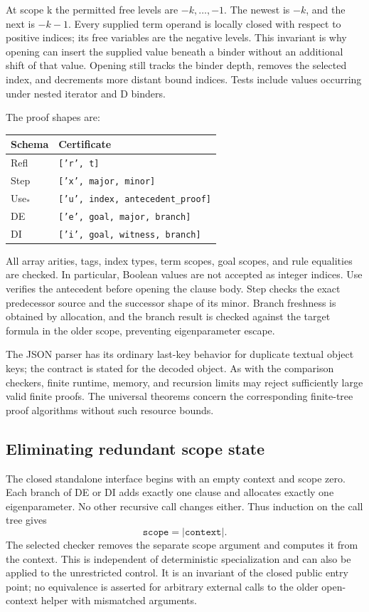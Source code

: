 \documentclass[11pt,letterpaper]{article}
\theoremstyle{definition}
\begin{document}
At scope k the permitted free levels are \(-k,\ldots,-1\).
The newest is \(-k\), and the next is \(-k-1\). Every supplied term
operand is locally closed with respect to positive indices; its free
variables are the negative levels. This invariant is why opening can
insert the supplied value beneath a binder without an additional shift
of that value. Opening still tracks the binder depth, removes the selected
index, and decrements more distant bound indices. Tests include values
occurring under nested iterator and D binders.

The proof shapes are:
\begin{center}
\begin{tabular}{ll}
\toprule
Schema & Certificate\\
\midrule
Refl & \texttt{['r', t]}\\
Step & \texttt{['x', major, minor]}\\
Use$_*$ & \texttt{['u', index, antecedent\_proof]}\\
DE & \texttt{['e', goal, major, branch]}\\
DI & \texttt{['i', goal, witness, branch]}\\
\bottomrule
\end{tabular}
\end{center}
All array arities, tags, index types, term scopes, goal scopes, and rule
equalities are checked. In particular, Boolean values are not accepted
as integer indices. Use verifies the antecedent before opening the
clause body. Step checks the exact predecessor source and the successor
shape of its minor. Branch freshness is obtained by allocation, and
the branch result is checked against the target formula in the older
scope, preventing eigenparameter escape.

The JSON parser has its ordinary last-key behavior for duplicate textual
object keys; the contract is stated for the decoded object. As with the
comparison checkers, finite runtime, memory, and recursion limits may
reject sufficiently large valid finite proofs. The universal theorems
concern the corresponding finite-tree proof algorithms without such
resource bounds.

\subsection{Eliminating redundant scope state}

The closed standalone interface begins with an empty context and scope
zero. Each branch of DE or DI adds exactly one clause and allocates
exactly one eigenparameter. No other recursive call changes either.
Thus induction on the call tree gives
\[
          \texttt{scope}=\lvert\texttt{context}\rvert.
\]
The selected checker removes the separate scope argument and computes
it from the context. This is independent of deterministic specialization
and can also be applied to the unrestricted control. It is an invariant
of the closed public entry point; no equivalence is asserted for arbitrary
external calls to the older open-context helper with mismatched arguments.
\end{document}
